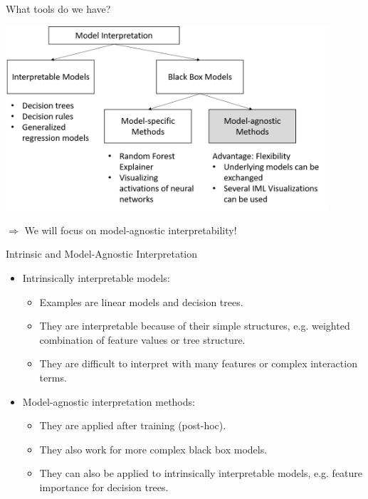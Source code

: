 \documentclass[11pt,compress,t,notes=noshow, xcolor=table]{beamer}
\begin{document}
\begin{vbframe}{What tools do we have?}
 \begin{center}
  \includegraphics[width=0.9\textwidth]{figure_man/overview}
 \end{center}
 $\Rightarrow$ We will focus on model-agnostic interpretability!
\end{vbframe}

\begin{vbframe}{Intrinsic and Model-Agnostic Interpretation}
\begin{itemize}
  \item Intrinsically interpretable models:
  \begin{itemize}
  \item Examples are linear models and decision trees.
  \item They are interpretable because of their simple structures, e.g. 
  weighted combination of feature values or tree structure. 
  \item They are difficult to interpret with many features or complex interaction terms.
  \end{itemize}
  \lz
  \item Model-agnostic interpretation methods:
  \begin{itemize}
  \item They are applied after training (post-hoc).
  \item They also work for more complex black box models.
  \item They can also be applied to intrinsically interpretable models, e.g.
    feature importance for decision trees. 
  \end{itemize}
\end{itemize}
\end{vbframe}
\end{document}
